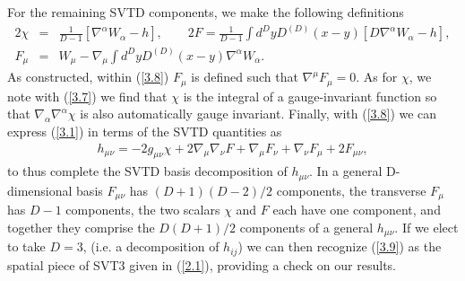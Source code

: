 For the remaining SVTD components, we make the following definitions
%
\begin{eqnarray}
2\chi&=&\frac{1}{D-1}[\nabla^{\alpha}W_{\alpha}-h],\quad 
\quad 2F=\frac{1}{D-1}\int d^DyD^{(D)}(x-y)[D\nabla^{\alpha}W_{\alpha}-h],
\nonumber\\
F_{\mu}&=&W_{\mu}-\nabla_{\mu}\int d^DyD^{(D)}(x-y)\nabla^{\alpha}W_{\alpha}.
\label{3.8}
\end{eqnarray}
%
As constructed, within (\ref{3.8}) $F_\mu$ is defined such that $\nabla^{\mu}F_{\mu}=0$. As for $\chi$, we note with (\ref{3.7}) we find that  $\chi$ is the integral of a gauge-invariant function so that $\nabla_{\alpha}\nabla^{\alpha}\chi$ is also automatically gauge invariant. Finally, with (\ref{3.8}) we can express (\ref{3.1}) in terms of the SVTD quantities as
%
\begin{eqnarray}
h_{\mu\nu}=-2g_{\mu\nu}\chi+2\nabla_{\mu}\nabla_{\nu}F
+ \nabla_{\mu}F_{\nu}+\nabla_{\nu}F_{\mu}+2F_{\mu\nu},
\label{3.9}
\end{eqnarray}
%
to thus complete the SVTD basis decomposition of $h_{\mu\nu}$. In a general D-dimensional basis $F_{\mu\nu}$ has $(D+1)(D-2)/2$ components, the transverse $F_{\mu}$ has $D-1$ components, the two scalars $\chi$ and $F$ each have one component, and together they comprise the $D(D+1)/2$ components of a general $h_{\mu\nu}$. If we  elect to take $D=3$, (i.e. a decomposition of $h_{ij}$) we can then recognize (\ref{3.9}) as the spatial piece of SVT3 given in (\ref{2.1}), providing a check on our results.



